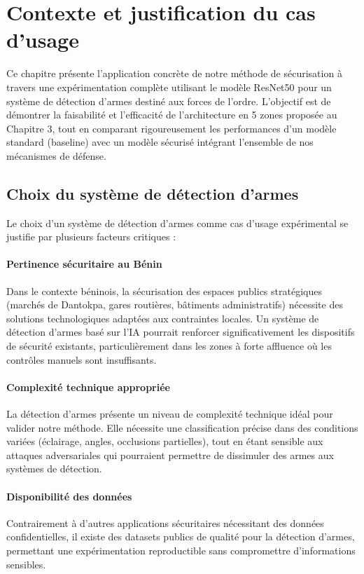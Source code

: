 \section{Contexte et justification du cas d'usage}

Ce chapitre présente l'application concrète de notre méthode de sécurisation à travers une expérimentation complète utilisant le modèle ResNet50 pour un système de détection d'armes destiné aux forces de l'ordre. L'objectif est de démontrer la faisabilité et l'efficacité de l'architecture en 5 zones proposée au Chapitre 3, tout en comparant rigoureusement les performances d'un modèle standard (baseline) avec un modèle sécurisé intégrant l'ensemble de nos mécanismes de défense.

\subsection{Choix du système de détection d'armes}

Le choix d'un système de détection d'armes comme cas d'usage expérimental se justifie par plusieurs facteurs critiques :

\paragraph{Pertinence sécuritaire au Bénin}
Dans le contexte béninois, la sécurisation des espaces publics stratégiques (marchés de Dantokpa, gares routières, bâtiments administratifs) nécessite des solutions technologiques adaptées aux contraintes locales. Un système de détection d'armes basé sur l'IA pourrait renforcer significativement les dispositifs de sécurité existants, particulièrement dans les zones à forte affluence où les contrôles manuels sont insuffisants.

\paragraph{Complexité technique appropriée}
La détection d'armes présente un niveau de complexité technique idéal pour valider notre méthode. Elle nécessite une classification précise dans des conditions variées (éclairage, angles, occlusions partielles), tout en étant sensible aux attaques adversariales qui pourraient permettre de dissimuler des armes aux systèmes de détection.

\paragraph{Disponibilité des données}
Contrairement à d'autres applications sécuritaires nécessitant des données confidentielles, il existe des datasets publics de qualité pour la détection d'armes, permettant une expérimentation reproductible sans compromettre d'informations sensibles.

